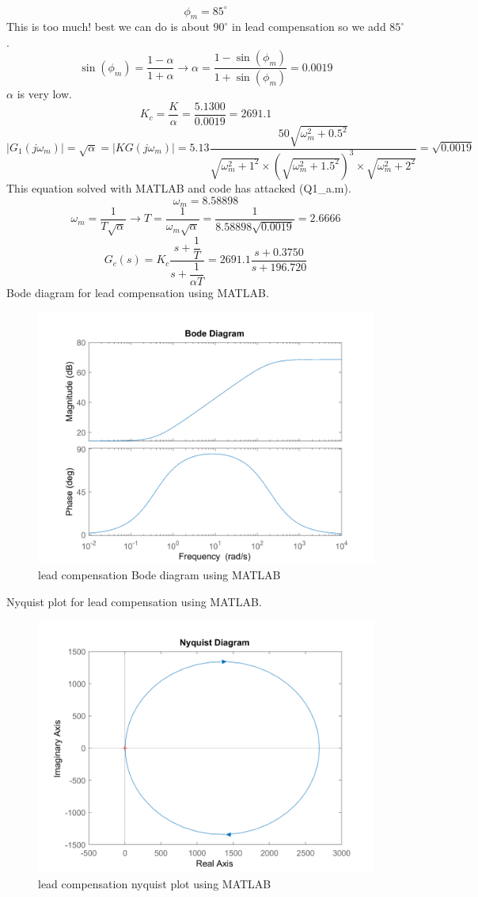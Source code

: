 $$
\phi_m = 85^{\circ}
$$
This is too much!
best we can do is about $90^{\circ}$ in lead compensation so we add $85^{\circ}$.
$$
\sin(\phi_m) = \dfrac{1-\alpha}{1+\alpha} \to
\alpha = \dfrac{1-\sin(\phi_m) }{1+\sin(\phi_m) } = 0.0019
$$
$\alpha$ is very low.
$$
K_c = \dfrac{K}{\alpha} = \dfrac{5.1300}{0.0019} = 2691.1
$$
$$
\left\vert G_1(j\omega_m) \right\vert = \sqrt{\alpha} = \left\vert KG(j\omega_m) \right\vert = 5.13 \dfrac{50\sqrt{\omega_m^2+0.5^2}}{\sqrt{\omega_m^2+1^2}\times(\sqrt{\omega_m^2 + 1.5^2})^3\times\sqrt{\omega_m^2 + 2^2}} = \sqrt{0.0019}
$$
This equation solved with MATLAB and code has attacked (Q1\_a.m).
$$
\omega_m = 8.58898
$$
$$
\omega_m = \dfrac{1}{T\sqrt{\alpha}} \to
T = \dfrac{1}{\omega_m\sqrt{\alpha}} = \dfrac{1}{8.58898\sqrt{0.0019}} = 2.6666
$$
$$
G_c(s) = K_c \dfrac{s + \dfrac{1}{T}}{s + \dfrac{1}{\alpha T}} = 2691.1\dfrac{s + 0.3750}{s + 196.720}
$$
Bode diagram for lead compensation using MATLAB.
\begin{figure}[H]
	\caption{lead compensation Bode diagram using MATLAB}
	\centering
	\includegraphics[width=12cm]{../Figure/Q1/a/controller_bode.png}
\end{figure}
Nyquist plot for lead compensation using MATLAB.
\begin{figure}[H]
	\caption{lead compensation nyquist plot using MATLAB}
	\centering
	\includegraphics[width=12cm]{../Figure/Q1/a/controller_nyquist.png}
\end{figure}
